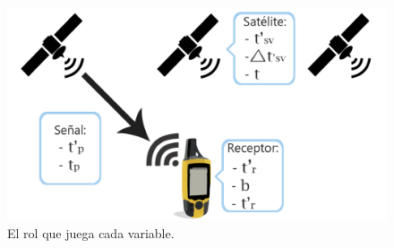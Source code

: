 \begin{figure}[H]
\centering
\includegraphics[scale=0.999]{Figures/DiagramaMat}
\caption[El rol que juega cada variable.]{El rol que juega cada variable.}
\label{fig:DiagMat}
\end{figure}

